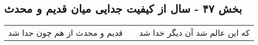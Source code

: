 \begin{center}
\section*{بخش ۴۷ - سال از کیفیت جدایی میان قدیم و محدث}
\label{sec:sh047}
\begin{longtable}{l p{0.5cm} r}
قدیم و محدث از هم چون جدا شد
&&
که این عالم شد آن دیگر خدا شد
\\
\end{longtable}
\end{center}
